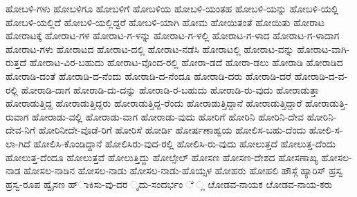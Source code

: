 ಹೋಬಳಿ-ಗಳು
ಹೋಬಳಿಗೂ
ಹೋಬಳಿಗೆ
ಹೋಬಳಿಯ
ಹೋಬಳಿ-ಯಂತಹ
ಹೋಬಳಿ-ಯನ್ನು
ಹೋಬಳಿ-ಯಲ್ಲಿ
ಹೋಬಳಿ-ಯಲ್ಲಿದೆ
ಹೋಬಳಿ-ಯಲ್ಲಿದ್ದರೆ
ಹೋಬಳಿ-ಯಾಗಿ
ಹೋಮ
ಹೋಯಿತಂತೆ
ಹೋಯಿತು
ಹೋರಾಟ
ಹೋರಾಟಕ್ಕೆ
ಹೋರಾಟ-ಗಳ
ಹೋರಾಟ-ಗ-ಳನ್ನು
ಹೋರಾಟ-ಗ-ಳಲ್ಲಿ
ಹೋರಾಟ-ಗ-ಳಾದ
ಹೋರಾಟ-ಗ-ಳಾದಾಗ
ಹೋರಾಟ-ಗಳು
ಹೋರಾಟದ
ಹೋರಾಟ-ದಲ್ಲಿ
ಹೋರಾಟ-ನಡೆಸಿ
ಹೋರಾಟಲ್ಲಿ
ಹೋರಾಟ-ವನ್ನು
ಹೋರಾಟ-ವಾಗಿ-ರುತ್ತದೆ
ಹೋರಾಟ-ವಿರ-ಬಹುದು
ಹೋರಾಟ-ವೊಂದ-ರಲ್ಲಿ
ಹೋರಾ-ಡದೆ
ಹೋರಾ-ಡಲು
ಹೋರಾಡಿ
ಹೋರಾಡಿದ
ಹೋರಾಡಿ-ದಂತೆ
ಹೋರಾಡಿ-ದ-ನೆಂದು
ಹೋರಾಡಿ-ದ-ನೆಂದೂ
ಹೋರಾಡಿ-ದರು
ಹೋರಾಡಿ-ದರೆ
ಹೋರಾಡಿ-ದ-ವ-ರಲ್ಲಿ
ಹೋರಾಡಿ-ದಾಗ
ಹೋರಾಡಿ-ದು-ದನ್ನು
ಹೋರಾಡಿ-ರ-ಬಹುದು
ಹೋರಾಡಿ-ರು-ವುದು
ಹೋರಾಡುತ್ತಾ
ಹೋರಾಡುತ್ತಿದ್ದ
ಹೋರಾಡುತ್ತಿದ್ದರು
ಹೋರಾಡುತ್ತಿದ್ದ-ರೆಂದು
ಹೋರಾಡುತ್ತಿದ್ದಾನೆ
ಹೋರಾಡುತ್ತಿದ್ದಾರೆ
ಹೋರಾಡುತ್ತಿ-ರುವಾಗ
ಹೋರಾಡು-ವಲ್ಲಿ
ಹೋರಾಡು-ವಾಗ
ಹೋರಾಡು-ವುದು
ಹೋರಿಗೆ
ಹೋರಿನಿ
ಹೋರಿನಿ-ದೇವ
ಹೋರಿನಿ-ದೇವ-ನಿಗೆ
ಹೋರಿನೀದೇ-ವೊಡೆ-ರಿಗೆ
ಹೋರಿಸೆ
ಹೋರ್ಡಿ
ಹೋರ್ಷಣಾಹ್ವಯ
ಹೋಲಿಸ-ಬಹು-ದೆಂದು
ಹೋಲಿ-ಸ-ಲಾ-ಗಿದೆ
ಹೋಲಿಸಿ-ಕೊಂಡಿದ್ದಾನೆ
ಹೋಲಿಸಿರು-ವುದ-ರಲ್ಲಿ
ಹೋಲಿಸಿ-ರು-ವುದು
ಹೋಲುತ್ತದೆ
ಹೋಲುತ್ತ-ದೆಂದು
ಹೋಲುತ್ತ-ದೆಂದೂ
ಹೋಲುತ್ತವೆ
ಹೋಲುತ್ತಿದ್ದು
ಹೋಲ್ಸೇಲ್
ಹೋಸಣ
ಹೋಸಣ-ದೇಶದ
ಹೋಸಣಾಖ್ಯ
ಹೋಸಲ-ನಾಡ
ಹೋಸಲ-ನಾಡಿನ
ಹೋಸಲ-ನಾಡು
ಹೋಸಲ-ನಾಡು-ಹೊಯ್ಸಳ
ಹೋಹರು
ಹೋಹಲಿ
ಹೌಸ್ಗೆ
ಹ್ಯಾರಿಸ್
ಹ್ರಸ್ವ
ಹ್ರಸ್ವ-ರೂಪ
ಹ್ವೈಸಣ
ಹ್ಾಕಿಸು-ವು-ದರ
ೃದು-ಸಂದರ್ಭಂ
ೆ
್ಲ
ೞೋಡವ-ನಾಯಕ
ೞೋಡವ-ನಾಯ-ಕರು
